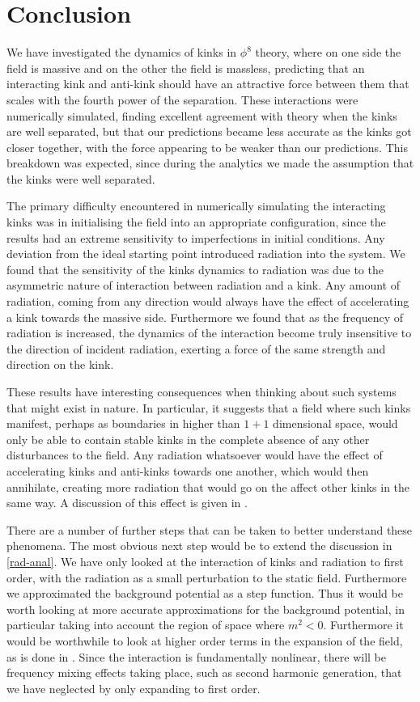 \documentclass[11pt, oneside]{article}  	%
\numberwithin{equation}{section}
\begin{document}
\section{Conclusion}
We have investigated the dynamics of kinks in $\phi^8$ theory, where on one side the field is massive and on the other the field is massless, predicting that an interacting kink and anti-kink should have an attractive force between them that scales with the fourth power of the separation. These interactions were numerically simulated, finding excellent agreement with theory when the kinks are well separated, but that our predictions became less accurate as the kinks got closer together, with the force appearing to be weaker than our predictions. This breakdown was expected, since during the analytics we made the assumption that the kinks were well separated.\par
The primary difficulty encountered in numerically simulating the interacting kinks was in initialising the field into an appropriate configuration, since the results had an extreme sensitivity to imperfections in initial conditions. Any deviation from the ideal starting point introduced radiation into the system. We found that the sensitivity of the kinks dynamics to radiation was due to the asymmetric nature of interaction between radiation and a kink. Any amount of radiation, coming from any direction would always have the effect of accelerating a kink towards the massive side. Furthermore we found that as the frequency of radiation is increased, the dynamics of the interaction become truly insensitive to the direction of incident radiation, exerting a force of the same strength and direction on the kink.\par
These results have interesting consequences when thinking about such systems that might exist in nature. In particular, it suggests that a field where such kinks manifest, perhaps as boundaries in higher than $1 + 1$ dimensional space, would only be able to contain stable kinks in the complete absence of any other disturbances to the field. Any radiation whatsoever would have the effect of accelerating kinks and anti-kinks towards one another, which would then annihilate, creating more radiation that would go on the affect other kinks in the same way. A discussion of this effect is given in \cite{Roma_czukiewicz_2017}.\par
There are a number of further steps that can be taken to better understand these phenomena. The most obvious next step would be to extend the discussion in \textsection \ref{rad-anal}. We have only looked at the interaction of kinks and radiation to first order, with the radiation as a small perturbation to the static field. Furthermore we approximated the background potential as a step function. Thus it would be worth looking at more accurate approximations for the background potential, in particular taking into account the region of space where $m^2 < 0$. Furthermore it would be worthwhile to look at higher order terms in the expansion of the field, as is done in \cite{rad_pressure}. Since the interaction is fundamentally nonlinear, there will be frequency mixing effects taking place, such as second harmonic generation, that we have neglected by only expanding to first order.\par
\end{document}
